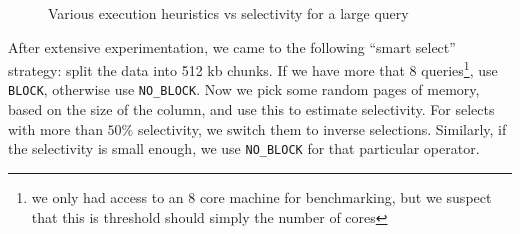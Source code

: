 \documentclass[a4paper, 12pt]{article}
\begin{document}
 \begin{figure}[ht]
     \begin{center}
        \caption{Various execution heuristics vs selectivity for a  large query}
        \label{fig:heuristic}
     \end{center}
 \end{figure}

\medskip
After extensive experimentation, we came to the following ``smart select'' strategy: split the data into 512 kb chunks. If we have more that 8 queries\footnote{we only had access to an 8 core machine for benchmarking, but we suspect that this is threshold should simply the number of cores}, use \texttt{BLOCK}, otherwise use \texttt{NO\_BLOCK}. Now we pick some random pages of memory, based on the size of the column, and use this to estimate selectivity. For selects with more than $50\%$ selectivity, we switch them to inverse selections. Similarly, if the selectivity is small enough, we use \texttt{NO\_BLOCK} for that particular operator.
\end{document}
